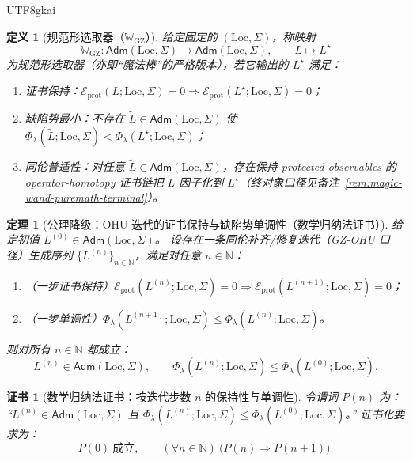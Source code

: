\documentclass[12pt]{article}
\newtheorem{definition}{定义}[section]
\newtheorem{theorem}{定理}[section]
\newtheorem{Certificate}{证书}[section]
\newcommand{\NN}{\mathbb{N}}
\begin{document}
\begin{CJK*}{UTF8}{gkai}
\begin{definition}[规范形选取器（\texorpdfstring{$\mathbb{W}_{\mathrm{GZ}}$}{W\_GZ}）]
\label{def:magic-wand-puremath-wand}
给定固定的 $(\mathrm{Loc},\Sigma)$，称映射
\[
  \mathbb{W}_{\mathrm{GZ}}:\mathsf{Adm}(\mathrm{Loc},\Sigma)\to \mathsf{Adm}(\mathrm{Loc},\Sigma),
  \qquad
  L\longmapsto L^\star
\]
为规范形选取器（亦即“魔法棒”的严格版本），若它输出的 $L^\star$ 满足：
\begin{enumerate}
  \item 证书保持：$\mathcal{E}_{\mathrm{prot}}(L;\mathrm{Loc},\Sigma)=0\Rightarrow \mathcal{E}_{\mathrm{prot}}(L^\star;
    \mathrm{Loc},\Sigma)=0$；
  \item 缺陷势最小：不存在 $\widetilde L\in\mathsf{Adm}(\mathrm{Loc},\Sigma)$ 使 $\Phi_\lambda(\widetilde L;\mathrm{Loc},\Sigma)
    <\Phi_\lambda(L^\star;\mathrm{Loc},\Sigma)$；
  \item 同伦普适性：对任意 $\widetilde L\in\mathsf{Adm}(\mathrm{Loc},\Sigma)$，存在保持 protected observables 的 operator-homotopy 证书链把
    $\widetilde L$ 因子化到 $L^\star$（终对象口径见备注~\ref{rem:magic-wand-puremath-terminal}）。
\end{enumerate}
\end{definition}

\begin{theorem}[公理降级：OHU 迭代的证书保持与缺陷势单调性（数学归纳法证书）]
\label{thm:magic-wand-puremath-monotone}
给定初值 $L^{(0)}\in\mathsf{Adm}(\mathrm{Loc},\Sigma)$。
设存在一条同伦补齐/修复迭代（GZ-OHU 口径）生成序列 $\{L^{(n)}\}_{n\in\NN}$，满足对任意 $n\in\NN$：
\begin{enumerate}
  \item （一步证书保持）$\mathcal{E}_{\mathrm{prot}}(L^{(n)};\mathrm{Loc},\Sigma)=0\Rightarrow \mathcal{E}_{\mathrm{prot}}
    (L^{(n+1)};\mathrm{Loc},\Sigma)=0$；
  \item （一步单调性）$\Phi_\lambda(L^{(n+1)};\mathrm{Loc},\Sigma)\le \Phi_\lambda(L^{(n)};\mathrm{Loc},\Sigma)$。
\end{enumerate}
则对所有 $n\in\NN$ 都成立：
\[
  L^{(n)}\in\mathsf{Adm}(\mathrm{Loc},\Sigma),
  \qquad
  \Phi_\lambda(L^{(n)};\mathrm{Loc},\Sigma)\le \Phi_\lambda(L^{(0)};\mathrm{Loc},\Sigma).
\]
\end{theorem}

\begin{Certificate}[数学归纳法证书：按迭代步数 $n$ 的保持性与单调性]
\label{cert:magic-wand-puremath-monotone}
令谓词 $P(n)$ 为：
“$L^{(n)}\in\mathsf{Adm}(\mathrm{Loc},\Sigma)$ 且 $\Phi_\lambda(L^{(n)};\mathrm{Loc},\Sigma)\le \Phi_\lambda(L^{(0)};
  \mathrm{Loc},\Sigma)$。”
证书化要求为：
\[
  P(0)\ \text{成立},\qquad
  (\forall n\in\NN)\ \bigl(P(n)\Rightarrow P(n+1)\bigr).
\]
\end{Certificate}


\end{CJK*}
\end{document}
